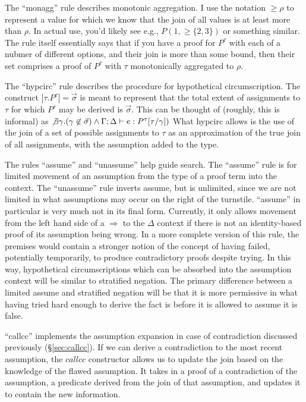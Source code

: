 The ``monagg'' rule describes monotonic aggregation.
I use the notation $\geq \rho$ to represent a value for which we know that the join of all values is at least more than $\rho$.
In actual use, you'd likely see e.g., $P(1, \geq \{2, 3\})$ or something similar.
The rule itself essentially says that if you have a proof for $P^\tau$ with each of a nubmer of different options, and their join is more than some bound, then their set comprises a proof of $P^\tau$ with $\tau$ monotonically aggregated to $\rho$.

The ``hypcirc'' rule describes the procedure for hypothetical circumscription.
The construct $|\tau.P^\tau| = \vec{\sigma}$ is meant to represent that the total extent of assignments to $\tau$ for which $P^\tau$ may be derived is $\vec{\sigma}$.
This can be thought of (roughly, this is informal) as $\not \exists \gamma. (\gamma \not \in \vec{\sigma}) \wedge \Gamma; \Delta \vdash e : P^\tau[\tau/\gamma])$
What hypcirc allows is the use of the join of a set of possible assignments to $\tau$ as an approximation of the true join of all assignments, with the assumption added to the type.

The rules ``assume'' and ``unassume'' help guide search.
The ``assume'' rule is for limited movement of an assumption from the type of a proof term into the context.
The ``unassume'' rule inverts assume, but is unlimited, since we are not limited in what assumptions may occur on the right of the turnstile.
``assume'' in particular is very much not in its final form.
Currently, it only allows movement from the left hand side of a $\Rightarrow$ to the $\Delta$ context if there is not an identity-based proof of its assumption being wrong.
In a more complete version of this rule, the premises would contain a stronger notion of the concept of having failed, potentially temporarily, to produce contradictory proofs despite trying.
In this way, hypothetical circumscriptions which can be absorbed into the assumption context will be similar to stratified negation.
The primary difference between a limited assume and stratified negation will be that it is more permissive in what having tried hard enough to derive the fact is before it is allowed to assume it is false.

``callcc'' implements the assumption expansion in case of contradiction discussed previously (\S \ref{sec:callcc}).
If we can derive a contradiction to the most recent assumption, the $callcc$ constructor allows us to update the join based on the knowledge of the flawed assumption.
It takes in a proof of a contradiction of the assumption, a predicate derived from the join of that assumption, and updates it to contain the new information.


